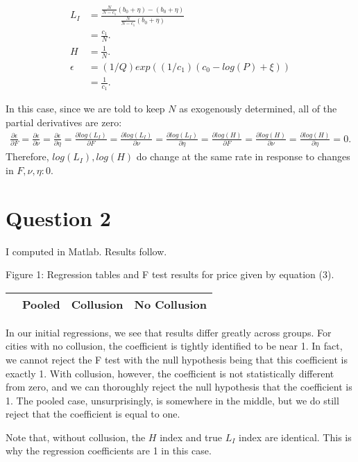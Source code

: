\documentclass[11pt]{article} %
\begin{document}
\begin{align*}
L_I &= \frac{\frac{N}{N-c_1}(b_0 + \eta) - (b_0 + \eta)}{\frac{N}{N-c_1}(b_0 + \eta)}\\
&= \frac{c_1}{N}. \\
H &= \frac{1}{N}. \\
\epsilon &= (1/Q)exp((1/c_1)(c_0 - log(P) + \xi)) \\
&= \frac{1}{c_1}.
\end{align*}

In this case, since we are told to keep $N$ as exogenously determined, all of the partial derivatives are zero:
\begin{align*}
\frac{\partial \epsilon}{\partial F} = \frac{\partial \epsilon}{\partial \nu} = \frac{\partial \epsilon}{\partial \eta} = \frac{\partial log(L_I)}{\partial F} = \frac{\partial log(L_I)}{\partial \nu} = \frac{\partial log(L_I)}{\partial \eta} = \frac{\partial log(H)}{\partial F} = \frac{\partial log(H)}{\partial \nu} = \frac{\partial log(H)}{\partial \eta} = 0.
\end{align*}
Therefore, $log(L_I),log(H)$ do change at the same rate in response to changes in $F,\nu,\eta: 0$.
\section{Question 2}
I computed in Matlab. Results follow.

\bigskip
\begin{center}
Figure 1: Regression tables and F test results for price given by equation (3).
\begin{tabular}{l | lll}
\hline
 & Pooled & Collusion & No Collusion \\
\hline \hline

\hline

\hline
\end{tabular}
\end{center}

\bigskip

In our initial regressions, we see that results differ greatly across groups. For cities with no collusion, the coefficient is tightly identified to be near 1. In fact, we cannot reject the F test with the null hypothesis being that this coefficient is exactly 1. With collusion, however, the coefficient is not statistically different from zero, and we can thoroughly reject the null hypothesis that the coefficient is 1. The pooled case, unsurprisingly, is somewhere in the middle, but we do still reject that the coefficient is equal to one.

Note that, without collusion, the $H$ index and true $L_I$ index are identical. This is why the regression coefficients are 1 in this case.
\end{document}
